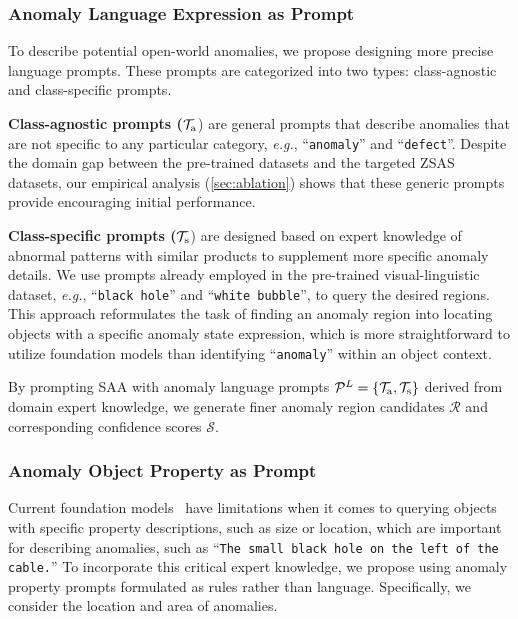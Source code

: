 \subsubsection{Anomaly Language Expression as Prompt}

To describe potential open-world anomalies, we propose designing more precise language prompts. These prompts are categorized into two types: class-agnostic and class-specific prompts. 

\noindent \textbf{Class-agnostic prompts ($\mathcal{T}_{\rm a}$}) are general prompts that describe anomalies that are not specific to any particular category, \textit{e.g.}, ``\verb|anomaly|'' and ``\verb|defect|''. Despite the domain gap between the pre-trained datasets and the targeted ZSAS datasets, our empirical analysis (\ref{sec:ablation}) shows that these generic prompts provide  encouraging initial performance.

\noindent \textbf{Class-specific prompts ($\mathcal{T}_{\rm s}$}) are designed based on expert knowledge of abnormal patterns with similar products to supplement more specific anomaly details.
We use prompts already employed in the pre-trained visual-linguistic dataset, \textit{e.g.}, ``\verb|black hole|'' and ``\verb|white bubble|'', to query the desired regions. This approach reformulates the task of finding an anomaly region into locating objects with a specific anomaly state expression, which is more straightforward to utilize foundation models than identifying ``\verb|anomaly|'' within an object context.

By prompting SAA with anomaly language prompts $\mathcal{P}^L=\{ \mathcal{T}_{\rm a}, \mathcal{T}_ {\rm s}   \}$ derived from domain expert knowledge, we generate finer anomaly region candidates $\mathcal{R}$ and corresponding confidence scores $\mathcal{S}$. 

\subsubsection{Anomaly Object Property as Prompt}

Current foundation models~\cite{liu2023grounding, li2021grounded} have limitations when it comes to querying objects with specific property descriptions, such as size or location, which are important for describing anomalies, such as ``\verb|The small black hole on the left of the cable.|'' To incorporate this critical expert knowledge, we propose using anomaly property prompts formulated as rules rather than language. Specifically, we consider the location and area of anomalies.

